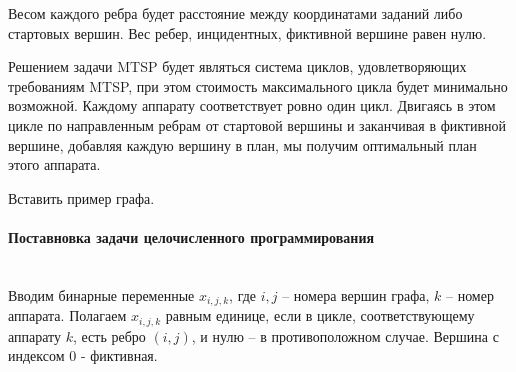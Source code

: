 \documentclass[a4paper,14pt,russian]{article}
\begin{document}
Весом каждого ребра будет расстояние между координатами заданий либо стартовых вершин. Вес ребер, инцидентных, фиктивной вершине равен нулю.

Решением задачи MTSP будет являться система циклов, удовлетворяющих требованиям MTSP, при этом стоимость максимального цикла будет минимально возможной. Каждому аппарату соответствует ровно один цикл. Двигаясь в этом цикле по направленным ребрам от стартовой вершины и заканчивая в фиктивной вершине, добавляя каждую вершину в план, мы получим оптимальный план этого аппарата.


Вставить пример графа.


\paragraph{Поставновка задачи целочисленного программирования} ~\\

Вводим бинарные переменные $x_{i,j,k}$, где $i, j$ -- номера вершин графа, $k$ -- номер аппарата. Полагаем $x_{i,j,k}$ равным единице, если в цикле, соответствующему аппарату $k$, есть ребро $(i, j)$, и нулю -- в противоположном случае. Вершина с индексом $0$ - фиктивная.
\end{document}
